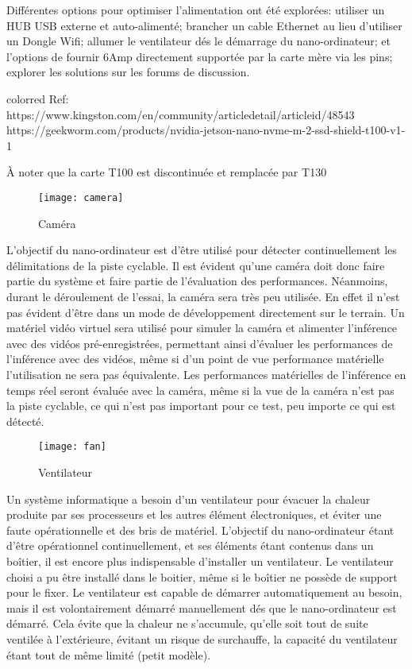 \par Différentes options pour optimiser l'alimentation ont été explorées: utiliser un HUB USB externe et auto-alimenté; brancher un cable Ethernet au lieu d'utiliser un Dongle Wifi; allumer le ventilateur dés le démarrage du nano-ordinateur; et l'options de fournir 6Amp directement supportée par la carte mère via les pins; explorer les solutions sur les forums de discussion. 
{color{red}
Ref: https://www.kingston.com/en/community/articledetail/articleid/48543
https://geekworm.com/products/nvidia-jetson-nano-nvme-m-2-ssd-shield-t100-v1-1
\par À noter que la carte T100 est discontinuée et remplacée par T130
}
\begin{figure}
    \centering
    \texttt{[image: camera]}
    \caption{Caméra}
    \label{fig:camera}
\end{figure}
\par L'objectif du nano-ordinateur est d'être utilisé pour détecter continuellement les délimitations de la piste cyclable. Il est évident qu'une caméra doit donc faire partie du système et faire partie de l'évaluation des performances. Néanmoins, durant le déroulement de l'essai, la caméra sera très peu utilisée. En effet il n'est pas évident d'être dans un mode de développement directement sur le terrain. Un matériel vidéo virtuel sera utilisé pour simuler la caméra et alimenter l'inférence avec des vidéos pré-enregistrées, permettant ainsi d'évaluer les performances de l'inférence avec des vidéos, même si d'un point de vue performance matérielle l'utilisation ne sera pas équivalente. Les performances matérielles de l'inférence en temps réel seront évaluée avec la caméra, même si la vue de la caméra n'est pas la piste cyclable, ce qui n'est pas important pour ce test, peu importe ce qui est détecté.
\begin{figure}
    \centering
    \texttt{[image: fan]}
    \caption{Ventilateur}
    \label{fig:fan}
\end{figure}
\par Un système informatique a besoin d'un ventilateur pour évacuer la chaleur produite par ses processeurs et les autres élément électroniques, et éviter une faute opérationnelle et des bris de matériel. L'objectif du nano-ordinateur étant d'être opérationnel continuellement, et ses éléments étant contenus dans un boîtier, il est encore plus indispensable d'installer un ventilateur. Le ventilateur choisi a pu être installé dans le boitier, même si le boîtier ne possède de support pour le fixer. Le ventilateur est capable de démarrer automatiquement au besoin, mais il est volontairement démarré manuellement dés que le nano-ordinateur est démarré. Cela évite que la chaleur ne s'accumule, qu'elle soit tout de suite ventilée à l'extérieure, évitant un risque de surchauffe, la capacité du ventilateur étant tout de même limité (petit modèle).
